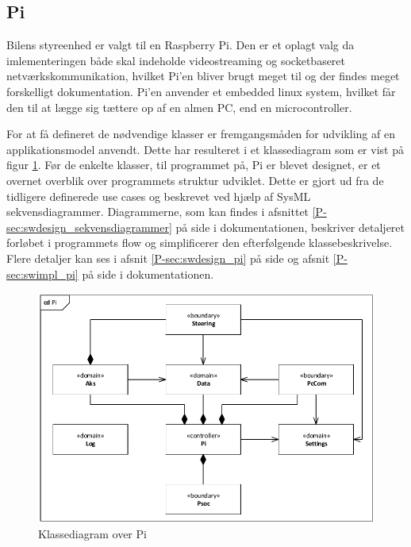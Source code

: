 \subsection{Pi}

Bilens styreenhed er valgt til en Raspberry Pi. Den er et oplagt valg da imlementeringen både skal indeholde videostreaming og socketbaseret netværkskommunikation, hvilket Pi'en bliver brugt meget til og der findes meget forskelligt dokumentation. 
Pi'en anvender et embedded linux system, hvilket får den til at lægge sig tættere op af en almen PC, end en microcontroller.

For at få defineret de nødvendige klasser er fremgangsmåden for udvikling af en applikationsmodel anvendt.
Dette har resulteret i et klassediagram som er vist på figur \ref{fig:cd_pi}.
Før de enkelte klasser, til programmet på, Pi er blevet designet, er et overnet overblik over programmets struktur udviklet.
Dette er gjort ud fra de tidligere definerede use cases og beskrevet ved hjælp af SysML sekvensdiagrammer.
Diagrammerne, som kan findes i afsnittet \ref{P-sec:swdesign_sekvensdiagrammer}  på side \pageref{P-sec:swdesign_sekvensdiagrammer} i dokumentationen, beskriver detaljeret forløbet i programmets flow og simplificerer den efterfølgende klassebeskrivelse. Flere detaljer kan ses i afsnit \ref{P-sec:swdesign_pi}  på side \pageref{P-sec:swdesign_pi} og afsnit \ref{P-sec:swimpl_pi}  på side \pageref{P-sec:swimpl_pi} i dokumentationen.

\begin{figure}[h]
\centering
\includegraphics[width=\textwidth* 10/10]{../fig/diagrammer/bil/cd_pi.pdf}
\caption{Klassediagram over Pi}
\label{fig:cd_pi}
\end{figure}

